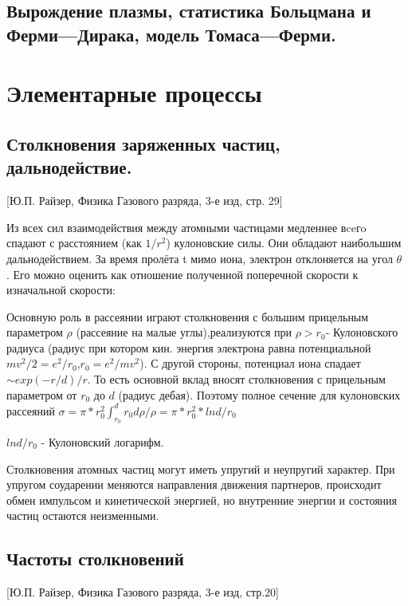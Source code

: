 \documentclass[10pt, a4paper]{article}
\begin{document}
\subsection{Вырождение плазмы, статистика Больцмана и Ферми—Дирака, модель Томаса—Ферми.}


\section{Элементарные процессы}
\label{sec.2}

\subsection{Столкновения заряженных частиц, дальнодействие.}
\label{sec.2.1}

[Ю.П. Райзер, Физика Газового разряда, 3-е изд, стр. 29]

Из всех сил взаимодействия между атомными частицами медленнее вceгo спадают с расстоянием (как $1/r^{2}$)  кулоновские силы. Они обладают наибольшим дальнодействием.
За время пролёта t мимо иона, электрон отклоняется на угол $\theta$ . Его можно оценить как отношение полученной поперечной скорости к изначальной скорости:

Основную роль в рассеянии играют столкновения с большим прицельным параметром $\rho$ (рассеяние на малые углы),реализуются при  $\rho > r_{0}$- Кулоновского радиуса (радиус при котором кин. энергия электрона равна потенциальной $ mv^{2}/2 = e^{2}/ r_{0} $,$ r_{0}=e^{2}/mv^{2} $). С другой стороны, потенциал иона спадает $\sim exp(-r/d)/r $. То есть основной вклад вносят столкновения с прицельным параметром от  $r_{0}$   до $d$ (радиус дебая).
Поэтому полное сечение для кулоновских рассеяний $\sigma= \pi*r_{0}^{2} \int_{r_{0}}^{d} r_{0} d\rho/\rho =\pi*r_{0}^{2}*ln{d/r_{0}}$

$ln{d/r_{0}}$ - Кулоновский логарифм.

Столкновения атомных частиц могут иметь упругий и неупругий характер. При упругом соударении меняются направления движения партнеров, происходит обмен импульсом и кинетической энергией, но внутренние энергии и состояния частиц остаются неизменными.

\subsection{Частоты столкновений}
\label{sec.2.2}

[Ю.П. Райзер, Физика Газового разряда, 3-е изд, стр.20]
\end{document}
